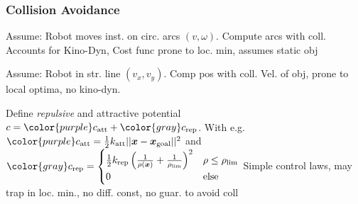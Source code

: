 \subsubsection{Collision Avoidance}
 Assume: Robot moves inst. on circ. arcs $(v, \omega)$.
Compute arcs with coll. {\color{ForestGreen} Accounts for Kino-Dyn}, {\color{red} Cost func prone to loc. min, assumes static obj}

 Assume: Robot in str. line $(v_x, v_y)$. Comp pos with coll.
    {\color{ForestGreen} Vel. of obj}, {\color{red} prone to local optima, no kino-dyn.}

 Define {\color{gray} \textit{repulsive}} and {\color{purple} attractive} potential $c = {\color{purple} c_{\text{att}}} + {\color{gray} c_{\text{rep}}}$.
With e.g. ${\color{purple} c_\text{att}} = \frac{1}{2} k_\text{att} ||\vec{x} - \vec{x}_\text{goal}||^2$ and ${\color{gray} c_\text{rep}} = \begin{cases}
        \frac{1}{2} k_\text{rep} \left( \frac{1}{\rho(\vec{x})} + \frac{1}{\rho_{\lim}} \right)^2 & \rho \leq \rho_{\lim} \\
        0                                                                                         & \text{else}
    \end{cases}$
{\color{ForestGreen} Simple control laws}, {\color{red} may trap in loc. min., no diff. const, no guar. to avoid coll}

